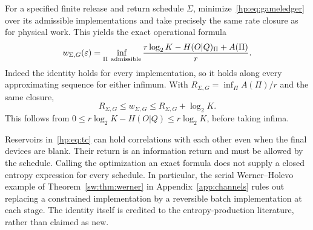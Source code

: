 For a specified finite release and return schedule $\Sigma$, minimize~\eqref{hp:eq:gameledger} over its admissible implementations and take precisely the same rate closure as for physical work. This yields the exact operational formula
\begin{equation}
 w_{\Sigma,G}(\varepsilon)=\inf_{\Pi\ {\rm admissible}}
 \frac{r\log_2K-H(O|Q)_\Pi+A(\Pi)}r.\label{hp:eq:operational}
\end{equation}
Indeed the identity holds for every implementation, so it holds along every approximating sequence for either infimum. With $R_{\Sigma,G}=\inf_\Pi A(\Pi)/r$ and the same closure,
\begin{equation}
 R_{\Sigma,G}\le w_{\Sigma,G}\le R_{\Sigma,G}+\log_2K.\label{hp:eq:reservoir}
\end{equation}
This follows from $0\le r\log_2K-H(O|Q)\le r\log_2K$, before taking infima.

Reservoirs in~\eqref{hp:eq:tc} can hold correlations with each other even when the final devices are blank. Their return is an information return and must be allowed by the schedule. Calling the optimization an exact formula does not supply a closed entropy expression for every schedule. In particular, the serial Werner--Holevo example of Theorem~\ref{sw:thm:werner} in Appendix~\ref{app:channels} rules out replacing a constrained implementation by a reversible batch implementation at each stage. The identity itself is credited to the entropy-production literature, rather than claimed as new.
